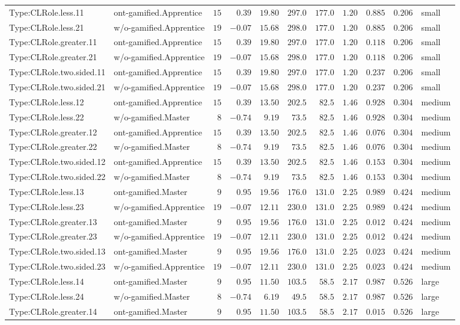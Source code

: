 \documentclass[6pt,a4paper]{article}
\begin{document}
{\begin{longtable}{llrrrrrrrrl}
Type:CLRole.less.11&ont-gamified.Apprentice&$15$&$ 0.39$&$19.80$&$297.0$&$177.0$&$ 1.20$&$0.885$&$0.206$&small\tabularnewline
Type:CLRole.less.21&w/o-gamified.Apprentice&$19$&$-0.07$&$15.68$&$298.0$&$177.0$&$ 1.20$&$0.885$&$0.206$&small\tabularnewline
Type:CLRole.greater.11&ont-gamified.Apprentice&$15$&$ 0.39$&$19.80$&$297.0$&$177.0$&$ 1.20$&$0.118$&$0.206$&small\tabularnewline
Type:CLRole.greater.21&w/o-gamified.Apprentice&$19$&$-0.07$&$15.68$&$298.0$&$177.0$&$ 1.20$&$0.118$&$0.206$&small\tabularnewline
Type:CLRole.two.sided.11&ont-gamified.Apprentice&$15$&$ 0.39$&$19.80$&$297.0$&$177.0$&$ 1.20$&$0.237$&$0.206$&small\tabularnewline
Type:CLRole.two.sided.21&w/o-gamified.Apprentice&$19$&$-0.07$&$15.68$&$298.0$&$177.0$&$ 1.20$&$0.237$&$0.206$&small\tabularnewline
Type:CLRole.less.12&ont-gamified.Apprentice&$15$&$ 0.39$&$13.50$&$202.5$&$ 82.5$&$ 1.46$&$0.928$&$0.304$&medium\tabularnewline
Type:CLRole.less.22&w/o-gamified.Master&$ 8$&$-0.74$&$ 9.19$&$ 73.5$&$ 82.5$&$ 1.46$&$0.928$&$0.304$&medium\tabularnewline
Type:CLRole.greater.12&ont-gamified.Apprentice&$15$&$ 0.39$&$13.50$&$202.5$&$ 82.5$&$ 1.46$&$0.076$&$0.304$&medium\tabularnewline
Type:CLRole.greater.22&w/o-gamified.Master&$ 8$&$-0.74$&$ 9.19$&$ 73.5$&$ 82.5$&$ 1.46$&$0.076$&$0.304$&medium\tabularnewline
Type:CLRole.two.sided.12&ont-gamified.Apprentice&$15$&$ 0.39$&$13.50$&$202.5$&$ 82.5$&$ 1.46$&$0.153$&$0.304$&medium\tabularnewline
Type:CLRole.two.sided.22&w/o-gamified.Master&$ 8$&$-0.74$&$ 9.19$&$ 73.5$&$ 82.5$&$ 1.46$&$0.153$&$0.304$&medium\tabularnewline
Type:CLRole.less.13&ont-gamified.Master&$ 9$&$ 0.95$&$19.56$&$176.0$&$131.0$&$ 2.25$&$0.989$&$0.424$&medium\tabularnewline
Type:CLRole.less.23&w/o-gamified.Apprentice&$19$&$-0.07$&$12.11$&$230.0$&$131.0$&$ 2.25$&$0.989$&$0.424$&medium\tabularnewline
Type:CLRole.greater.13&ont-gamified.Master&$ 9$&$ 0.95$&$19.56$&$176.0$&$131.0$&$ 2.25$&$0.012$&$0.424$&medium\tabularnewline
Type:CLRole.greater.23&w/o-gamified.Apprentice&$19$&$-0.07$&$12.11$&$230.0$&$131.0$&$ 2.25$&$0.012$&$0.424$&medium\tabularnewline
Type:CLRole.two.sided.13&ont-gamified.Master&$ 9$&$ 0.95$&$19.56$&$176.0$&$131.0$&$ 2.25$&$0.023$&$0.424$&medium\tabularnewline
Type:CLRole.two.sided.23&w/o-gamified.Apprentice&$19$&$-0.07$&$12.11$&$230.0$&$131.0$&$ 2.25$&$0.023$&$0.424$&medium\tabularnewline
Type:CLRole.less.14&ont-gamified.Master&$ 9$&$ 0.95$&$11.50$&$103.5$&$ 58.5$&$ 2.17$&$0.987$&$0.526$&large\tabularnewline
Type:CLRole.less.24&w/o-gamified.Master&$ 8$&$-0.74$&$ 6.19$&$ 49.5$&$ 58.5$&$ 2.17$&$0.987$&$0.526$&large\tabularnewline
Type:CLRole.greater.14&ont-gamified.Master&$ 9$&$ 0.95$&$11.50$&$103.5$&$ 58.5$&$ 2.17$&$0.015$&$0.526$&large\tabularnewline

\end{longtable}}
\end{document}
